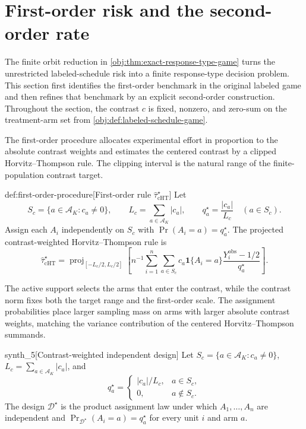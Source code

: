 \section{First-order risk and the second-order rate}\label{sec:rates}

The finite orbit reduction in \cref{obj:thm:exact-response-type-game} turns the unrestricted labeled-schedule risk into a finite response-type decision problem. This section first identifies the first-order benchmark in the original labeled game and then refines that benchmark by an explicit second-order construction. Throughout the section, the contrast \(c\) is fixed, nonzero, and zero-sum on the treatment-arm set from \cref{obj:def:labeled-schedule-game}.

The first-order procedure allocates experimental effort in proportion to the absolute contrast weights and estimates the centered contrast by a clipped Horvitz--Thompson rule. The clipping interval is the natural range of the finite-population contrast target.

\begin{definitionv}{def:first-order-procedure}[First-order rule $\widehat\tau_{\mathrm{cHT}}^\star$]
Let
\[
S_c=\{a\in\mathcal A_K:c_a\ne 0\},\qquad
L_c=\sum_{a\in\mathcal A_K}|c_a|,\qquad
q_a^\star=\frac{|c_a|}{L_c}\quad(a\in S_c).
\]
Assign each \(A_i\) independently on \(S_c\) with \(\Pr(A_i=a)=q_a^\star\). The projected contrast-weighted Horvitz--Thompson rule is
\[
\widehat\tau_{\mathrm{cHT}}^\star
=
\operatorname{proj}_{[-L_c/2,L_c/2]}\!\left[
n^{-1}\sum_{i=1}^n\sum_{a\in S_c}
c_a\mathbf 1\{A_i=a\}\frac{Y_i^{\mathrm{obs}}-1/2}{q_a^\star}
\right].
\]
\end{definitionv}

The active support  selects the arms that enter the contrast, while the contrast norm  fixes both the target range and the first-order scale. The assignment probabilities  place larger sampling mass on arms with larger absolute contrast weights, matching the variance contribution of the centered Horvitz--Thompson summands.

\begin{definitionv}{synth_5}[Contrast-weighted independent design]
Let \(S_c=\{a\in\mathcal A_K:c_a\ne0\}\), \(L_c=\sum_{a\in\mathcal A_K}|c_a|\), and
\[
q_a^\star=\begin{cases}|c_a|/L_c,&a\in S_c,\\ 0,&a\notin S_c.\end{cases}
\]
The design \(\mathcal D^\star\) is the product assignment law under which \(A_1,\ldots,A_n\) are independent and \(\Pr_{\mathcal D^\star}(A_i=a)=q_a^\star\) for every unit \(i\) and arm \(a\).
\end{definitionv}

